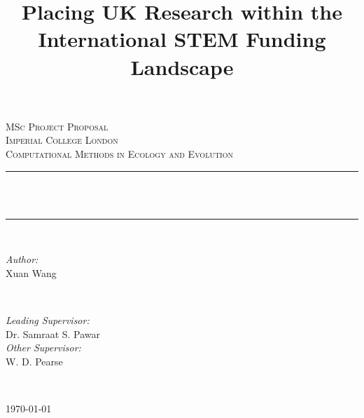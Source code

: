 \documentclass[11pt, oneside]{article}   	%
\title{Placing UK Research within the International STEM Funding Landscape}
\begin{document}
\begin{titlepage}
\newcommand{\HRule}{\rule{\linewidth}{0.5mm}}
\center
\textsc{\LARGE MSc Project Proposal}\\[1.5cm] %
\textsc{\Large Imperial College London}\\[0.5cm] %
\textsc{\large Computational Methods in Ecology and Evolution}\\[0.5cm] %
\makeatletter
\HRule \\[0.4cm]
{ \huge \bfseries \@title}\\[0.4cm] %
\HRule \\[1.5cm]
 

\begin{minipage}{0.4\textwidth}
\begin{flushleft} \large
\emph{Author:}\\
Xuan Wang %
\end{flushleft}
\end{minipage}
~
\begin{minipage}{0.4\textwidth}
\begin{flushright} \large
\emph{Leading Supervisor:} \\
Dr. Samraat S. Pawar \\[1.2em] %
\emph{Other Supervisor:} \\
W. D. Pearse
\end{flushright}
\end{minipage}\\[2cm]
\makeatother

{\large \today}\\[2cm] %

\vfill %

\end{titlepage}

\maketitle
\end{document}
